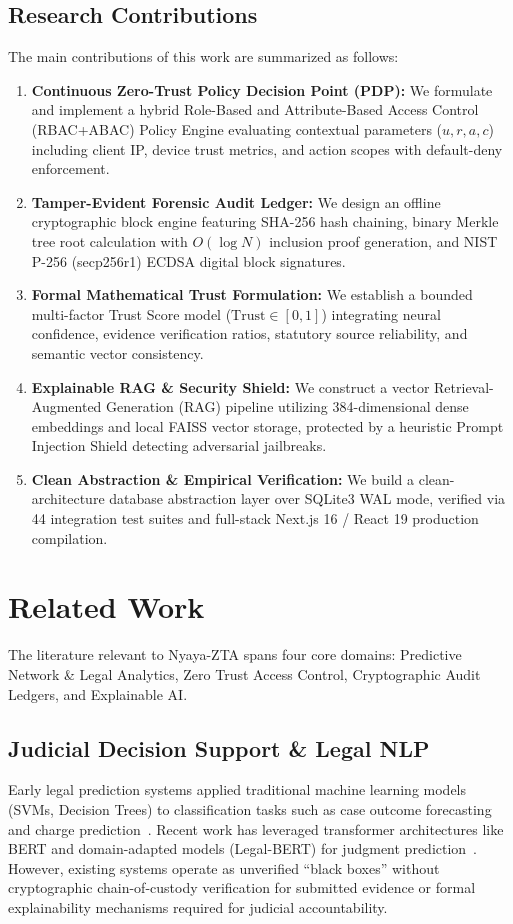 \documentclass[10pt,conference,two-column]{IEEEtran}
\begin{document}
\subsection{Research Contributions}
The main contributions of this work are summarized as follows:
\begin{enumerate}
    \item \textbf{Continuous Zero-Trust Policy Decision Point (PDP):} We formulate and implement a hybrid Role-Based and Attribute-Based Access Control (RBAC+ABAC) Policy Engine evaluating contextual parameters ($u, r, a, c$) including client IP, device trust metrics, and action scopes with default-deny enforcement.
    \item \textbf{Tamper-Evident Forensic Audit Ledger:} We design an offline cryptographic block engine featuring SHA-256 hash chaining, binary Merkle tree root calculation with $O(\log N)$ inclusion proof generation, and NIST P-256 (secp256r1) ECDSA digital block signatures.
    \item \textbf{Formal Mathematical Trust Formulation:} We establish a bounded multi-factor Trust Score model ($\text{Trust} \in [0, 1]$) integrating neural confidence, evidence verification ratios, statutory source reliability, and semantic vector consistency.
    \item \textbf{Explainable RAG \& Security Shield:} We construct a vector Retrieval-Augmented Generation (RAG) pipeline utilizing 384-dimensional dense embeddings and local FAISS vector storage, protected by a heuristic Prompt Injection Shield detecting adversarial jailbreaks.
    \item \textbf{Clean Abstraction \& Empirical Verification:} We build a clean-architecture database abstraction layer over SQLite3 WAL mode, verified via 44 integration test suites and full-stack Next.js 16 / React 19 production compilation.
\end{enumerate}

\section{Related Work}
The literature relevant to Nyaya-ZTA spans four core domains: Predictive Network \& Legal Analytics, Zero Trust Access Control, Cryptographic Audit Ledgers, and Explainable AI.

\subsection{Judicial Decision Support \& Legal NLP}
Early legal prediction systems applied traditional machine learning models (SVMs, Decision Trees) to classification tasks such as case outcome forecasting and charge prediction~\cite{surden2014machine, aletras2016predicting}. Recent work has leveraged transformer architectures like BERT and domain-adapted models (Legal-BERT) for judgment prediction~\cite{zhong2020how, devlin2018bert}. However, existing systems operate as unverified ``black boxes'' without cryptographic chain-of-custody verification for submitted evidence or formal explainability mechanisms required for judicial accountability.
\end{document}
